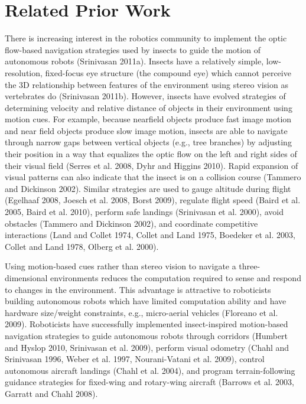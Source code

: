 \documentclass[12pt,letter]{article}
\begin{document}
\section{Related Prior Work} 

There is increasing interest in the robotics community to implement the optic flow-based navigation strategies used by insects to guide the motion of autonomous robots (Srinivasan 2011a). Insects have a relatively simple, low-resolution, fixed-focus eye structure (the compound eye) which cannot perceive the 3D relationship between features of the environment using stereo vision as vertebrates do (Srinivasan 2011b). However, insects have evolved strategies of determining velocity and relative distance of objects in their environment using motion cues. For example, because nearfield objects produce fast image motion and near field objects produce slow image motion, insects are able to navigate through narrow gaps between vertical objects (e.g., tree branches) by adjusting their position in a way that equalizes the optic flow on the left and right sides of their visual field (Serres et al. 2008, Dyhr and Higgins 2010). Rapid expansion of visual patterns can also indicate that the insect is on a collision course (Tammero and Dickinson 2002). Similar strategies are used to gauge altitude during flight (Egelhaaf 2008, Joesch et al. 2008, Borst 2009), regulate flight speed (Baird et al. 2005, Baird et al. 2010), perform safe landings (Srinivasan et al. 2000), avoid obstacles (Tammero and Dickinson 2002), and coordinate competitive interactions (Land and Collet 1974, Collet and Land 1975, Boedeker et al. 2003, Collet and Land 1978, Olberg et al. 2000). 

Using motion-based cues rather than stereo vision to navigate a three-dimensional environments reduces the computation required to sense and respond to changes in the environment. This advantage is attractive to roboticists building autonomous robots which have limited computation ability and have hardware size/weight constraints, e.g., micro-aerial vehicles (Floreano et al. 2009). Roboticists have successfully implemented insect-inspired motion-based navigation strategies to guide autonomous robots through corridors (Humbert and Hyslop 2010, Srinivasan et al. 2009), perform visual odometry (Chahl and Srinivasan 1996, Weber et al. 1997, Nourani-Vatani et al. 2009), control autonomous aircraft landings (Chahl et al. 2004), and program terrain-following guidance strategies for fixed-wing  and rotary-wing aircraft (Barrows et al. 2003,  Garratt and Chahl 2008). 
\end{document}

